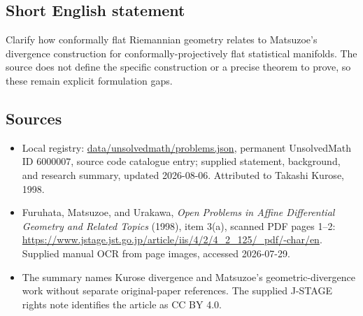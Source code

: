 \documentclass[11pt]{article}
\begin{document}
\subsection{Short English statement}
Clarify how conformally flat Riemannian geometry relates to Matsuzoe's divergence construction for conformally-projectively flat statistical manifolds. The source does not define the specific construction or a precise theorem to prove, so these remain explicit formulation gaps.
\subsection{Sources}
\begin{itemize}
\item Local registry: \url{data/unsolvedmath/problems.json}, permanent UnsolvedMath ID \(6000007\), source code catalogue entry; supplied statement, background, and research summary, updated 2026-08-06. Attributed to Takashi Kurose, 1998.
\item Furuhata, Matsuzoe, and Urakawa, \emph{Open Problems in Affine Differential Geometry and Related Topics} (1998), item 3(a), scanned PDF pages 1--2: \url{https://www.jstage.jst.go.jp/article/iis/4/2/4_2_125/_pdf/-char/en}. Supplied manual OCR from page images, accessed 2026-07-29.
\item The summary names Kurose divergence and Matsuzoe's geometric-divergence work without separate original-paper references. The supplied J-STAGE rights note identifies the article as CC BY 4.0.
\end{itemize}
\end{document}

